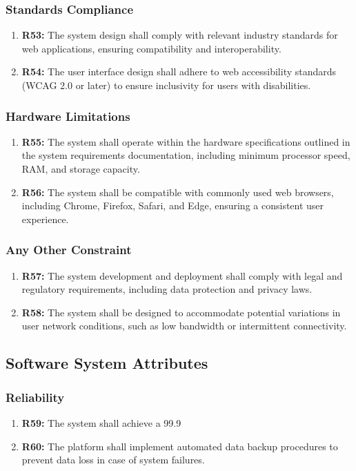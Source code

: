 \documentclass{article}
\begin{document}
\subsubsection{Standards Compliance}
\begin{enumerate}
  \item \textbf{R53:} The system design shall comply with relevant industry standards for web applications, ensuring compatibility and interoperability.
  \item \textbf{R54:} The user interface design shall adhere to web accessibility standards (WCAG 2.0 or later) to ensure inclusivity for users with disabilities.
\end{enumerate}

\subsubsection{Hardware Limitations}
\begin{enumerate}
  \item \textbf{R55:} The system shall operate within the hardware specifications outlined in the system requirements documentation, including minimum processor speed, RAM, and storage capacity.
  \item \textbf{R56:} The system shall be compatible with commonly used web browsers, including Chrome, Firefox, Safari, and Edge, ensuring a consistent user experience.
\end{enumerate}

\subsubsection{Any Other Constraint}
\begin{enumerate}
  \item \textbf{R57:} The system development and deployment shall comply with legal and regulatory requirements, including data protection and privacy laws.
  \item \textbf{R58:} The system shall be designed to accommodate potential variations in user network conditions, such as low bandwidth or intermittent connectivity.
\end{enumerate}

\subsection{Software System Attributes}
\subsubsection{Reliability}
\begin{enumerate}
  \item \textbf{R59:} The system shall achieve a 99.9%
  \item \textbf{R60:} The platform shall implement automated data backup procedures to prevent data loss in case of system failures.
\end{enumerate}
\end{document}
